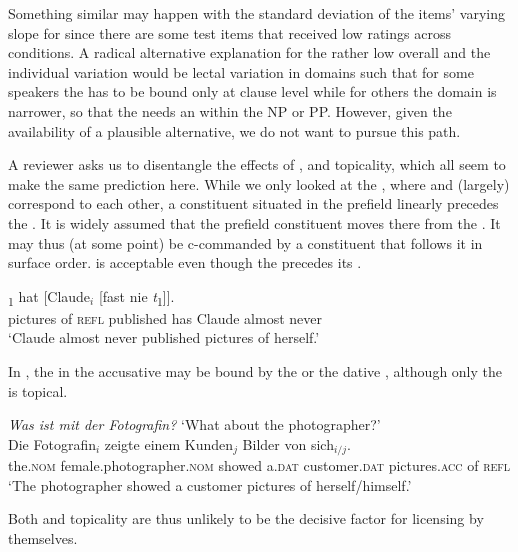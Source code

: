 \documentclass[output=paper,colorlinks,citecolor=brown]{langscibook}
\begin{document}
Something similar may happen with the standard deviation of the items' varying slope for  since there are some test items that received low ratings across conditions.
A radical alternative explanation for the rather low overall  and the individual variation would be lectal variation in  domains such that for some speakers the  has to be bound only at clause level while for others the  domain is narrower, so that the  needs an  within the NP or PP.
However, given the availability of a plausible alternative, we do not want to pursue this path.

A reviewer asks us to disentangle the effects of ,  and topicality, which all seem to make the same prediction here.
While we only looked at the , where  and  (largely) correspond to each other, a constituent situated in the prefield linearly precedes the .
It is widely assumed that the prefield constituent moves there from the .
It may thus (at some point) be c-commanded by a constituent that follows it in surface order.
 is acceptable even though the  precedes its .
\begin{exe}
    \ex {}\textsubscript{1} hat [Claude$_i$ [fast nie \textit{t}\textsubscript{1}]].\\
    pictures of \textsc{refl} published has Claude almost never\\
    \glt `Claude almost never published pictures of herself.'\label{ex:cahunveröffentlicht:Masloch}
\end{exe}
In , the  in the accusative  may be bound by the  or the dative , although only the  is topical.
\begin{exe}
    \ex \textit{Was ist mit der Fotografin?} `What about the photographer?'\\
    \gll Die Fotografin$_i$ zeigte einem Kunden$_j$ Bilder von sich$_{i/j}$.\\
    the.\textsc{nom} female.photographer.\textsc{nom} showed a.\textsc{dat} customer.\textsc{dat} pictures.\textsc{acc} of \textsc{refl}\\
    \glt `The photographer showed a customer pictures of herself/himself.'\label{ex:fotografin:Masloch}
\end{exe}
Both  and topicality are thus unlikely to be the decisive factor for licensing   by themselves.
\end{document}
